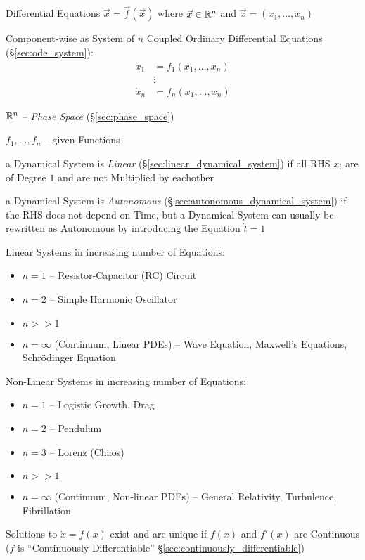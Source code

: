 Differential Equations $\dot{\vec{x}} = \vec{f}(\vec{x})$ where
$\vec{x} \in \mathbb{R}^n$ and $\vec{x} = (x_1,\ldots,x_n)$

Component-wise as System of $n$ Coupled Ordinary Differential Equations
(\S\ref{sec:ode_system}):
\begin{align*}
  \dot{x}_1 & = f_1(x_1,\ldots,x_n) \\
            & \vdots \\
  \dot{x}_n & = f_n(x_1,\ldots,x_n)
\end{align*}

$\mathbb{R}^n$ -- \emph{Phase Space} (\S\ref{sec:phase_space})

$f_1, \ldots, f_n$ -- given Functions

a Dynamical System is \emph{Linear} (\S\ref{sec:linear_dynamical_system}) if
all RHS $x_i$ are of Degree $1$ and are not Multiplied by eachother

a Dynamical System is \emph{Autonomous}
(\S\ref{sec:autonomous_dynamical_system}) if the RHS does not depend on Time,
but a Dynamical System can usually be rewritten as Autonomous by introducing
the Equation $\dot{t} = 1$

Linear Systems in increasing number of Equations:
\begin{itemize}
  \item $n = 1$ -- Resistor-Capacitor (RC) Circuit
  \item $n = 2$ -- Simple Harmonic Oscillator
  \item $n >> 1$
  \item $n = \infty$ (Continuum, Linear PDEs) -- Wave Equation, Maxwell's
    Equations, Schr\"odinger Equation
\end{itemize}

Non-Linear Systems in increasing number of Equations:
\begin{itemize}
  \item $n = 1$ -- Logistic Growth, Drag
  \item $n = 2$ -- Pendulum
  \item $n = 3$ -- Lorenz (Chaos)
  \item $n >> 1$
  \item $n = \infty$ (Continuum, Non-linear PDEs) -- General Relativity,
    Turbulence, Fibrillation
\end{itemize}

Solutions to $\dot{x} = f(x)$ exist and are unique if $f(x)$ and $f'(x)$ are
Continuous ($f$ is ``Continuously Differentiable''
\S\ref{sec:continuously_differentiable})


